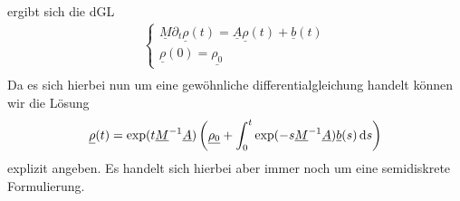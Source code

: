 ergibt sich die dGL
\begin{align*}
\begin{cases}
\underline{M} \partial_t \underline{\rho}(t) = \underline{A} \underline{\rho}(t) + \underline{b}(t) \\
\underline{\rho}(0) = \underline{\rho_0}
\end{cases}\\
\end{align*}
Da es sich hierbei nun um eine gewöhnliche differentialgleichung handelt können wir die Lösung 
\begin{align}
 \label{semidisklsg}
 \underline{\rho}(t) = \exp(t \underline{M}^{-1} \underline{A}) \left( \underline{\rho_0} + \int_{0}^{t} \exp(-s\underline{M}^{-1} \underline{A}) \underline{b}(s) \, \mathrm{d} s \right)
\end{align}
   explizit angeben.
Es handelt sich hierbei aber immer noch um eine semidiskrete Formulierung. 

